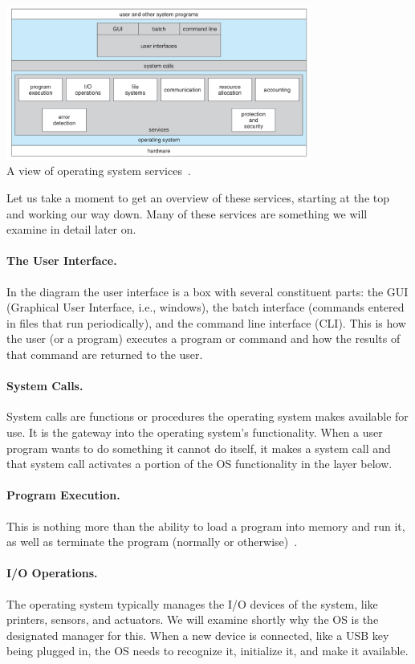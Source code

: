 \begin{center}
\includegraphics[width=0.75\textwidth]{images/os-structure.png}\\
A view of operating system services~\cite{osc}.
\end{center}

Let us take a moment to get an overview of these services, starting at the top and working our way down. Many of these services are something we will examine in detail later on.

\paragraph{The User Interface.} In the diagram the user interface is a box with several constituent parts: the GUI (Graphical User Interface, i.e., windows), the batch interface (commands entered in files that run periodically), and the command line interface (CLI). This is how the user (or a program) executes a program or command and how the results of that command are returned to the user.

\paragraph{System Calls.} System calls are functions or procedures the operating system makes available for use. It is the gateway into the operating system's functionality. When a user program wants to do something it cannot do itself, it makes a system call and that system call activates a portion of the OS functionality in the layer below.

\paragraph{Program Execution.} This is nothing more than the ability to load a program into memory and run it, as well as terminate the program (normally or otherwise)~\cite{osc}.

\paragraph{I/O Operations.} The operating system typically manages the I/O devices of the system, like printers, sensors, and actuators. We will examine shortly why the OS is the designated manager for this. When a new device is connected, like a USB key being plugged in, the OS needs to recognize it, initialize it, and make it available.

